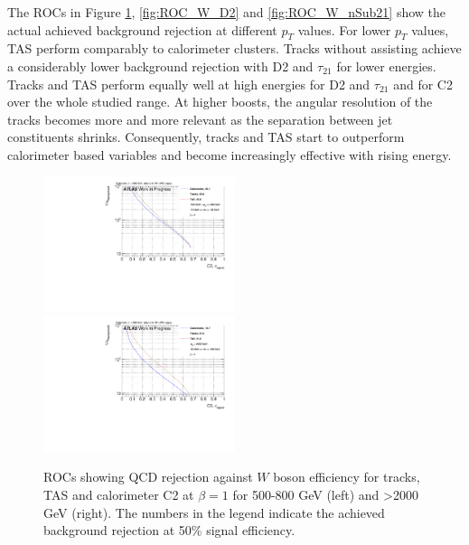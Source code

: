 The ROCs in Figure \ref{fig:ROC_W_C2}, \ref{fig:ROC_W_D2} and \ref{fig:ROC_W_nSub21} show the actual achieved background rejection at different $p_T$ values. For lower $p_T$ values, TAS perform comparably to calorimeter clusters. Tracks without assisting achieve a considerably lower background rejection with D2 and $\tau_{21}$ for lower energies. Tracks and TAS perform equally well at high energies for D2 and $\tau_{21}$ and for C2 over the whole studied range. At higher boosts, the angular resolution of the tracks becomes more and more relevant as the separation between jet constituents shrinks. Consequently, tracks and TAS start to outperform calorimeter based variables and become increasingly effective with rising energy. 
\begin{figure}[htp]
\includegraphics[width=0.5\textwidth]{sascha_input/plots/W/beta1/ROC_ALL_h_recoJet_C2_bin2.pdf} \hspace{1mm}
\includegraphics[width=0.5\textwidth]{sascha_input/plots/W/beta1/ROC_ALL_h_recoJet_C2_bin6.pdf}
\caption{\footnotesize{ROCs showing QCD rejection against $W$ boson efficiency for tracks, TAS and calorimeter C2 at $\beta=1$ for 500-800 GeV (left) and >2000 GeV (right). The numbers in the legend indicate the achieved background rejection at 50\% signal efficiency.}}\label{fig:ROC_W_C2}
\end{figure}

